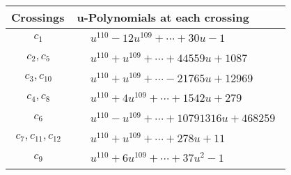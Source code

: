 \documentclass[1p]{elsarticle_modified}
\theoremstyle{definition}
\begin{document}
\begin{tabular}{m{50pt}|m{274pt}}
Crossings & \hspace{64pt}u-Polynomials at each crossing \\
\hline $$\begin{aligned}c_{1}\end{aligned}$$&$\begin{aligned}
&u^{110}-12 u^{109}+\cdots+30 u-1
\end{aligned}$\\
\hline $$\begin{aligned}c_{2},c_{5}\end{aligned}$$&$\begin{aligned}
&u^{110}+u^{109}+\cdots+44559 u+1087
\end{aligned}$\\
\hline $$\begin{aligned}c_{3},c_{10}\end{aligned}$$&$\begin{aligned}
&u^{110}+u^{109}+\cdots-21765 u+12969
\end{aligned}$\\
\hline $$\begin{aligned}c_{4},c_{8}\end{aligned}$$&$\begin{aligned}
&u^{110}+4 u^{109}+\cdots+1542 u+279
\end{aligned}$\\
\hline $$\begin{aligned}c_{6}\end{aligned}$$&$\begin{aligned}
&u^{110}- u^{109}+\cdots+10791316 u+468259
\end{aligned}$\\
\hline $$\begin{aligned}c_{7},c_{11},c_{12}\end{aligned}$$&$\begin{aligned}
&u^{110}+u^{109}+\cdots+278 u+11
\end{aligned}$\\
\hline $$\begin{aligned}c_{9}\end{aligned}$$&$\begin{aligned}
&u^{110}+6 u^{109}+\cdots+37 u^2-1
\end{aligned}$\\
\hline
\end{tabular}\\~\\
\end{document}
